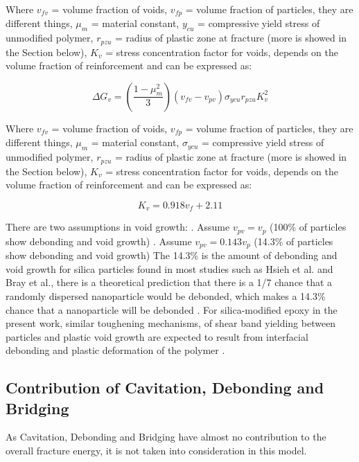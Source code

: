\documentclass[numbers=noendperiod,chapterprefix=on]{icldt} %
\begin{document}
Where $v_{fv}$ = volume fraction of voids, $v_{fp}$ = volume fraction of particles, they are different things, $\mu_m$ = material constant, $y_{cu}$ = compressive yield stress of unmodified polymer, $r_{pzu}$ = radius of plastic zone at fracture (more is showed in the Section below), $K_v$ = stress concentration factor for voids, depends on the volume fraction of reinforcement and can be expressed as:

\begin{equation} 
\Delta G_v=\left( \frac{1-\mu_m^2}{3}\right) 
(v_{fv}-v_{pv}
)\sigma_{ycu} r_{pzu} K_v^2
\end{equation}

Where $v_{fv}$ = volume fraction of voids, $v_{fp}$ = volume fraction of particles, they are different things, $\mu _m$ = material constant, $\sigma_{ycu}$ = compressive yield stress of unmodified polymer, $r_{pzu}$ = radius of plastic zone at fracture (more is showed in the Section below), $K_v$ = stress concentration factor for voids, depends on the volume fraction of reinforcement and can be expressed as:

\begin{equation} 
K_v=0.918v_f+2.11
\end{equation}

There are two assumptions in void growth:
.	Assume $v_{pv} = v_p$ (100\% of particles show debonding and void growth) 
.	Assume $v_{pv} = 0.143 v_p$ (14.3\% of particles show debonding and void growth)
\newline
The 14.3\% is the amount of debonding and void growth for silica particles found in most studies such as Hsieh et al.\cite{Mohammed2007} and Bray et al.\cite{Masania2010}, there is a theoretical prediction that there is a 1/7 chance that a randomly dispersed nanoparticle would be debonded, which makes a 14.3\% chance that a nanoparticle will be debonded \cite{Masania2010}.
For silica-modified epoxy in the present work, similar toughening mechanisms, of shear band yielding between particles and plastic void growth are expected to result from interfacial debonding and plastic deformation of the polymer \cite{Mohammed2007}. 

\subsection{Contribution of Cavitation, Debonding and Bridging}
As Cavitation, Debonding and Bridging have almost no contribution to the overall fracture energy, it is not taken into consideration in this model.
\end{document}
